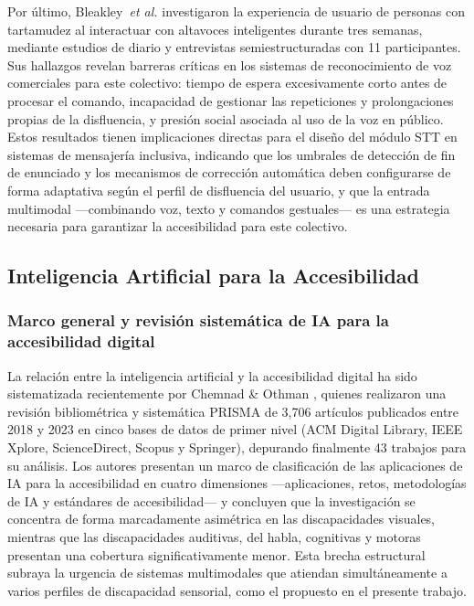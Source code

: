 \documentclass[journal]{IEEEtran}
\begin{document}
				Por \'ultimo, Bleakley~\textit{et al.} \cite{bleakley2022} investigaron la experiencia de usuario de personas con tartamudez al interactuar con altavoces inteligentes durante tres semanas, mediante estudios de diario y entrevistas semiestructuradas con 11 participantes. Sus hallazgos revelan barreras cr\'iticas en los sistemas de reconocimiento de voz comerciales para este colectivo: tiempo de espera excesivamente corto antes de procesar el comando, incapacidad de gestionar las repeticiones y prolongaciones propias de la disfluencia, y presi\'on social asociada al uso de la voz en p\'ublico. Estos resultados tienen implicaciones directas para el dise\~no del m\'odulo STT en sistemas de mensajer\'ia inclusiva, indicando que los umbrales de detecci\'on de fin de enunciado y los mecanismos de correcci\'on autom\'atica deben configurarse de forma adaptativa seg\'un el perfil de disfluencia del usuario, y que la entrada multimodal ---combinando voz, texto y comandos gestuales--- es una estrategia necesaria para garantizar la accesibilidad para este colectivo.
		
		\subsection{Inteligencia Artificial para la Accesibilidad}
			
			\subsubsection{Marco general y revisi\'on sistem\'atica de IA para la accesibilidad digital}
				La relaci\'on entre la inteligencia artificial y la accesibilidad digital ha sido sistematizada recientemente por Chemnad \& Othman \cite{chemnad2024}, quienes realizaron una revisi\'on bibliom\'etrica y sistem\'atica PRISMA de 3{,}706 art\'iculos publicados entre 2018 y 2023 en cinco bases de datos de primer nivel (ACM Digital Library, IEEE Xplore, ScienceDirect, Scopus y Springer), depurando finalmente 43 trabajos para su an\'alisis. Los autores presentan un marco de clasificaci\'on de las aplicaciones de IA para la accesibilidad en cuatro dimensiones ---aplicaciones, retos, metodolog\'ias de IA y est\'andares de accesibilidad--- y concluyen que la investigaci\'on se concentra de forma marcadamente asim\'etrica en las discapacidades visuales, mientras que las discapacidades auditivas, del habla, cognitivas y motoras presentan una cobertura significativamente menor. Esta brecha estructural subraya la urgencia de sistemas multimodales que atiendan simult\'aneamente a varios perfiles de discapacidad sensorial, como el propuesto en el presente trabajo.
				
\end{document}
